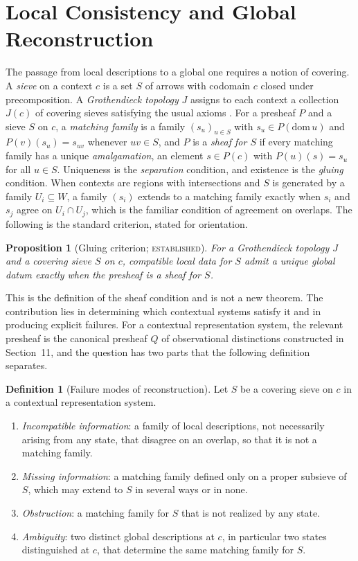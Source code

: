\documentclass[11pt]{article}
\newtheorem{proposition}[theorem]{Proposition}
\theoremstyle{definition}
\newtheorem{definition}[theorem]{Definition}
\theoremstyle{remark}
\newcommand{\stE}{\textsc{established}}
\begin{document}
\section{Local Consistency and Global Reconstruction}

The passage from local descriptions to a global one requires a notion of covering. A \emph{sieve} on a context $c$ is a set $S$ of arrows with codomain $c$ closed under precomposition. A \emph{Grothendieck topology} $J$ assigns to each context a collection $J(c)$ of covering sieves satisfying the usual axioms \cite{maclanemoerdijk}. For a presheaf $P$ and a sieve $S$ on $c$, a \emph{matching family} is a family $(s_u)_{u\in S}$ with $s_u\in P(\mathrm{dom}\,u)$ and $P(v)(s_u)=s_{uv}$ whenever $uv\in S$, and $P$ is a \emph{sheaf for $S$} if every matching family has a unique \emph{amalgamation}, an element $s\in P(c)$ with $P(u)(s)=s_u$ for all $u\in S$. Uniqueness is the \emph{separation} condition, and existence is the \emph{gluing} condition. When contexts are regions with intersections and $S$ is generated by a family $U_i\subseteq W$, a family $(s_i)$ extends to a matching family exactly when $s_i$ and $s_j$ agree on $U_i\cap U_j$, which is the familiar condition of agreement on overlaps. The following is the standard criterion, stated for orientation.

\begin{proposition}[Gluing criterion; \stE]\label{prop:gluing}
For a Grothendieck topology $J$ and a covering sieve $S$ on $c$, compatible local data for $S$ admit a unique global datum exactly when the presheaf is a sheaf for $S$.
\end{proposition}

This is the definition of the sheaf condition and is not a new theorem. The contribution lies in determining which contextual systems satisfy it and in producing explicit failures. For a contextual representation system, the relevant presheaf is the canonical presheaf $Q$ of observational distinctions constructed in Section~11, and the question has two parts that the following definition separates.

\begin{definition}[Failure modes of reconstruction]\label{def:failmodes}
Let $S$ be a covering sieve on $c$ in a contextual representation system.
\begin{enumerate}[label=(F\arabic*)]
\item \emph{Incompatible information}: a family of local descriptions, not necessarily arising from any state, that disagree on an overlap, so that it is not a matching family.
\item \emph{Missing information}: a matching family defined only on a proper subsieve of $S$, which may extend to $S$ in several ways or in none.
\item \emph{Obstruction}: a matching family for $S$ that is not realized by any state.
\item \emph{Ambiguity}: two distinct global descriptions at $c$, in particular two states distinguished at $c$, that determine the same matching family for $S$.
\end{enumerate}
\end{definition}
\end{document}
